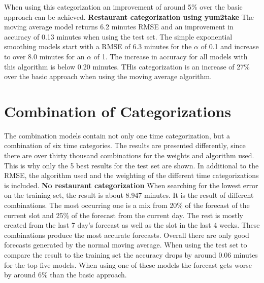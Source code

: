 When using this categorization an improvement of around 5\% over the basic approach can be achieved.
\newline\newline\textbf{Restaurant categorization using yum2take}\newline
The moving average model returns 6.2 minutes RMSE and an improvement in accuracy of 0.13 minutes when using the test set. The simple exponential smoothing models start with a RMSE of 6.3 minutes for the $\alpha$ of 0.1 and increase to over 8.0 minutes for an $\alpha$ of 1. The increase in accuracy for all models with this algorithm is below 0.20 minutes.\newline
THis categorization is an increase of 27\% over the basic approach when using the moving average algorithm.
\section{Combination of Categorizations}\label{section:Combination of Categorizations}
The combination models contain not only one time categorization, but a combination of six time categories.
The results are presented differently, since there are over thirty thousand combinations for the weights and algorithm used. This is why only the 5 best results for the test set are shown. In additional to the RMSE, the algorithm used and the weighting of the different time categorizations is included.
\newline\newline\textbf{No restaurant categorization}\newline
When searching for the lowest error on the training set, the result is about 8.947 minutes. It is the result of different combinations. The most occurring one is a mix from 20\% of the forecast of the current slot and 25\% of the forecast from the current day. The rest is mostly created from the last 7 day’s forecast as well as the slot in the last 4 weeks. These combinations produce the most accurate forecasts. Overall there are only good forecasts generated by the normal moving average. When using the test set to compare the result to the training set the accuracy drops by around 0.06 minutes for the top five models.\newline
When using one of these models the forecast gets worse by around 6\% than the basic approach.

